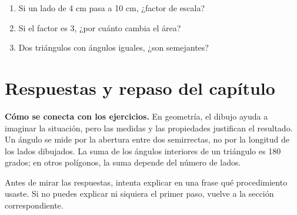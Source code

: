 \documentclass[10pt,oneside,openany]{book}
\begin{document}
\begin{practica}

\begin{enumerate}

\item Si un lado de 4 cm pasa a 10 cm, ¿factor de escala?

\item Si el factor es 3, ¿por cuánto cambia el área?

\item Dos triángulos con ángulos iguales, ¿son semejantes?

\end{enumerate}

\end{practica}



\section{Respuestas y repaso del capítulo}

\textbf{Cómo se conecta con los ejercicios.} En geometría, el dibujo ayuda a imaginar la situación, pero las medidas y las propiedades justifican el resultado. Un ángulo se mide por la abertura entre dos semirrectas, no por la longitud de los lados dibujados. La suma de los ángulos interiores de un triángulo es 180 grados; en otros polígonos, la suma depende del número de lados.

Antes de mirar las respuestas, intenta explicar en una frase qué procedimiento usaste. Si no puedes explicar ni siquiera el primer paso, vuelve a la sección correspondiente.
\end{document}
